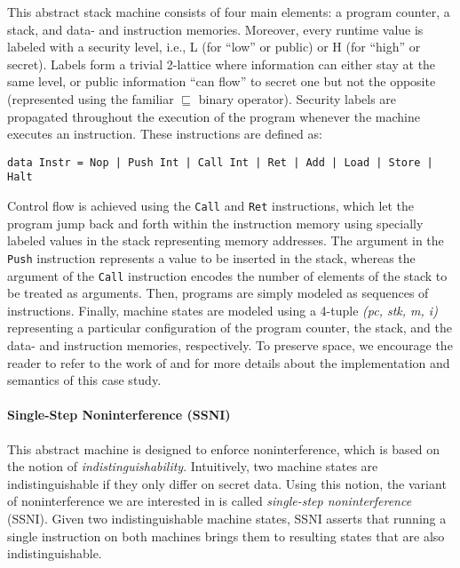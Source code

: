 \documentclass[sigconf,review,anonymous]{acmart}
\begin{document}
This abstract stack machine consists of four main elements: a program counter, a
stack, and data- and instruction memories.
%
Moreover, every runtime value is labeled with a security level, i.e., L (for
``low'' or public) or H (for ``high'' or secret).
%
Labels form a trivial 2-lattice where information can either stay at the same
level, or public information ``can flow'' to secret one but not the opposite
(represented using the familiar $\sqsubseteq$ binary operator).
%
Security labels are propagated throughout the execution of the program whenever
the machine executes an instruction.
%
These instructions are defined as:
%
\begin{verbatim}
data Instr = Nop | Push Int | Call Int | Ret | Add | Load | Store | Halt
\end{verbatim}

\noindent Control flow is achieved using the \texttt{Call} and \texttt{Ret}
instructions, which let the program jump back and forth within the instruction
memory using specially labeled values in the stack representing memory
addresses.
%
The argument in the \texttt{Push} instruction represents a value to be
inserted in the stack, whereas the argument of the \texttt{Call} instruction
encodes the number of elements of the stack to be treated as arguments.
%
Then, programs are simply modeled as sequences of instructions.
%
Finally, machine states are modeled using a 4-tuple \textit{(pc, stk, m, i)}
representing a particular configuration of the program counter, the stack, and
the data- and instruction memories, respectively.
%
To preserve space, we encourage the reader to refer to the work of
\citeauthor{hritcu2013testing} \citeyearpar{hritcu2013testing,
  hrictcu2016testing} and \citeauthor{lampropoulos2019coverage} for more details
about the implementation and semantics of this case study.

\paragraph{Single-Step Noninterference (SSNI)}

This abstract machine is designed to enforce noninterference, which is based on
the notion of \emph{indistinguishability}.
%
Intuitively, two machine states are indistinguishable if they only differ on
secret data.
%
Using this notion, the variant of noninterference we are interested in is called
\emph{single-step noninterference} \cite{hritcu2013testing} (SSNI).
%
Given two indistinguishable machine states, SSNI asserts that running a single
instruction on both machines brings them to resulting states that are also
indistinguishable.
\end{document}
